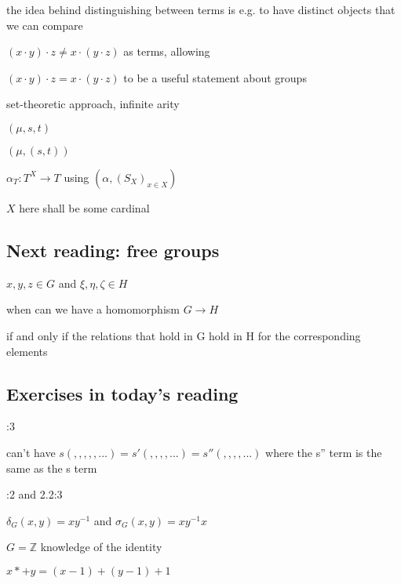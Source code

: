 \documentclass[12pt]{article}
\begin{document}
the idea behind distinguishing between terms is e.g. to have distinct objects that we can compare

$(x \cdot y) \cdot z \neq x \cdot (y \cdot z)$ as terms, allowing

$(x \cdot y) \cdot z = x \cdot (y \cdot z)$ to be a useful statement about groups

\noindent
set-theoretic approach, infinite arity

$(\mu, s, t)$

$(\mu, (s, t))$

$\alpha_T: T^X \to T$ using $(\alpha, (S_X)_{x \in X})$

$X$ here shall be some cardinal

\subsection{Next reading: free groups}

\noindent
$x, y, z \in G$ and $\xi, \eta, \zeta \in H$

when can we have a homomorphism $G \to H$

if and only if the relations that hold in G hold in H for the corresponding elements

\subsection{Exercises in today's reading}

:3

can't have $s( , , , , ,...) = s'( , , , , ...) = s''( , , , , ...)$ where the s'' term is the same as the s term

:2 and 2.2:3

$\delta_G(x, y) = xy^{-1}$ and $\sigma_G(x, y) = xy^{-1}x$

$G = \mathds{Z}$ knowledge of the identity

$x *+ y = (x - 1) + (y - 1) + 1$
\end{document}
